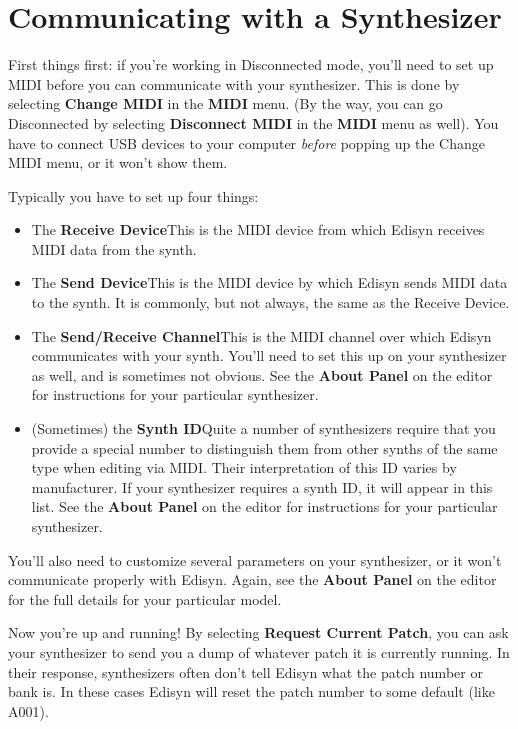 \documentclass{article}
\begin{document}
\section{Communicating with a Synthesizer}

First things first: if you're working in Disconnected mode, you'll need to set up MIDI before you can communicate with your synthesizer.  This is done by selecting {\bf Change MIDI} in the {\bf MIDI} menu.   (By the way, you can go Disconnected by selecting {\bf Disconnect MIDI} in the {\bf MIDI} menu as well).  You have to connect USB devices to your computer {\it before} popping up the Change MIDI menu, or it won't show them.

Typically you have to set up four things:

\begin{itemize}
\item The {\bf Receive Device}\quad  This is the MIDI device from which Edisyn receives MIDI data from the synth.
\item The {\bf Send Device}\quad  This is the MIDI device by which Edisyn sends MIDI data to the synth.  It is commonly, but not always, the same as the Receive Device.
\item The {\bf Send/Receive Channel}\quad  This is the MIDI channel over which Edisyn communicates with your synth.  You'll need to set this up on your synthesizer as well, and is sometimes not obvious.  See the {\bf About Panel} on the editor for instructions for your particular synthesizer.   
\item (Sometimes) the {\bf Synth ID}\quad  Quite a number of synthesizers require that you provide a special number to distinguish them from other synths of the same type when editing via MIDI.  Their interpretation of this ID varies by manufacturer.  If your synthesizer requires a synth ID, it will appear in this list.  See the {\bf About Panel} on the editor for instructions for your particular synthesizer.   
\end{itemize}

You'll also need to customize several parameters on your synthesizer, or it won't communicate properly with Edisyn.  Again, see the {\bf About Panel} on the editor for the full details for your particular model.

Now you're up and running!  By selecting {\bf Request Current Patch}, you can ask your synthesizer to send you a dump of whatever patch it is currently running.  In their response, synthesizers  often don't tell Edisyn what the patch number or bank is.  In these cases Edisyn will reset the patch number to some default (like A001).  
\end{document}
